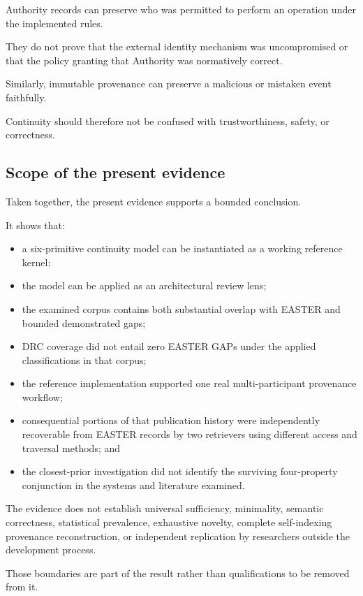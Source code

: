 \documentclass[11pt]{article}
\begin{document}
Authority records can preserve who was permitted to perform an operation under the implemented rules.

They do not prove that the external identity mechanism was uncompromised or that the policy granting that Authority was normatively correct.

Similarly, immutable provenance can preserve a malicious or mistaken event faithfully.

Continuity should therefore not be confused with trustworthiness, safety, or correctness.

\subsection{Scope of the present evidence}

Taken together, the present evidence supports a bounded conclusion.

It shows that:

\begin{itemize}
\item a six-primitive continuity model can be instantiated as a working reference kernel;
\item the model can be applied as an architectural review lens;
\item the examined corpus contains both substantial overlap with EASTER and bounded demonstrated gaps;
\item DRC coverage did not entail zero EASTER GAPs under the applied classifications in that corpus;
\item the reference implementation supported one real multi-participant provenance workflow;
\item consequential portions of that publication history were independently recoverable from EASTER records by two retrievers using different access and traversal methods; and
\item the closest-prior investigation did not identify the surviving four-property conjunction in the systems and literature examined.
\end{itemize}

The evidence does not establish universal sufficiency, minimality, semantic correctness, statistical prevalence, exhaustive novelty, complete self-indexing provenance reconstruction, or independent replication by researchers outside the development process.

Those boundaries are part of the result rather than qualifications to be removed from it.
\end{document}
